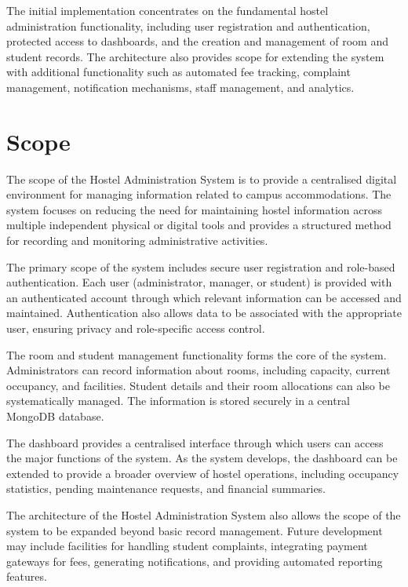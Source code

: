 The initial implementation concentrates on the fundamental hostel administration functionality, including user registration and authentication, protected access to dashboards, and the creation and management of room and student records. The architecture also provides scope for extending the system with additional functionality such as automated fee tracking, complaint management, notification mechanisms, staff management, and analytics.

\section{Scope}

The scope of the Hostel Administration System is to provide a centralised digital environment for managing information related to campus accommodations. The system focuses on reducing the need for maintaining hostel information across multiple independent physical or digital tools and provides a structured method for recording and monitoring administrative activities.

The primary scope of the system includes secure user registration and role-based authentication. Each user (administrator, manager, or student) is provided with an authenticated account through which relevant information can be accessed and maintained. Authentication also allows data to be associated with the appropriate user, ensuring privacy and role-specific access control.

The room and student management functionality forms the core of the system. Administrators can record information about rooms, including capacity, current occupancy, and facilities. Student details and their room allocations can also be systematically managed. The information is stored securely in a central MongoDB database.

The dashboard provides a centralised interface through which users can access the major functions of the system. As the system develops, the dashboard can be extended to provide a broader overview of hostel operations, including occupancy statistics, pending maintenance requests, and financial summaries.

The architecture of the Hostel Administration System also allows the scope of the system to be expanded beyond basic record management. Future development may include facilities for handling student complaints, integrating payment gateways for fees, generating notifications, and providing automated reporting features.

